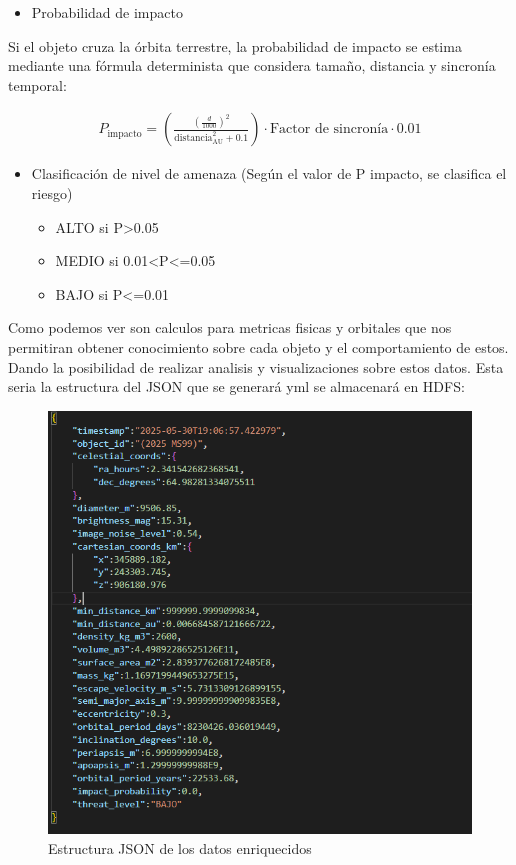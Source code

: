 \documentclass[12pt]{article}
\begin{document}
\begin{itemize}
  \item Probabilidad de impacto
\end{itemize}

Si el objeto cruza la órbita terrestre, la probabilidad de impacto se estima mediante una fórmula determinista que considera tamaño, 
distancia y sincronía temporal:

\begin{align*}
  P_{\text{impacto}} =
  \left( \frac{\left(\frac{d}{1000}\right)^2}{\text{distancia}_{\text{AU}}^2 + 0.1} \right)
  \cdot \text{Factor de sincronía} \cdot 0.01
\end{align*}

\begin{itemize}
  \item Clasificación de nivel de amenaza (Según el valor de P impacto, se clasifica el riesgo)
  \begin{itemize}
    \item ALTO si P>0.05
    \item MEDIO si 0.01<P<=0.05
    \item BAJO si P<=0.01
  \end{itemize}
\end{itemize}

Como podemos ver son calculos para metricas fisicas y orbitales que nos permitiran obtener conocimiento sobre cada objeto y el comportamiento
de estos. Dando la posibilidad de realizar analisis y visualizaciones sobre estos datos. Esta seria la estructura del JSON que se generará yml
se almacenará en HDFS:

\begin{figure}[h!]
    \centering
    \includegraphics[width=.7\textwidth]{assets/proyecto/json.PNG}
    \caption{Estructura JSON de los datos enriquecidos}
    \label{fig:my_label}
\end{figure}
\end{document}
